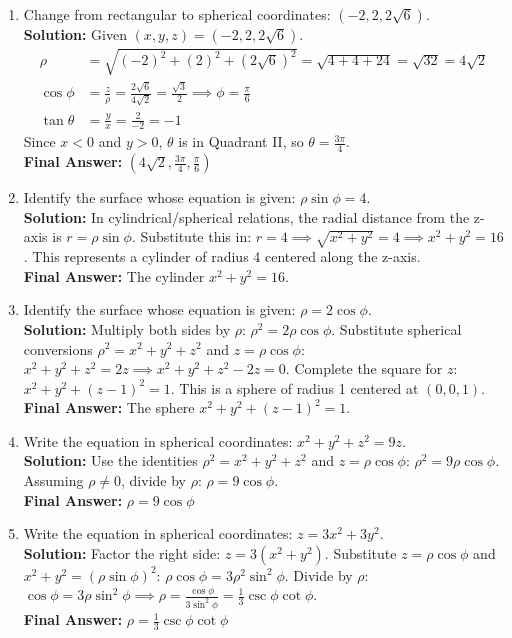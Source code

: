 \documentclass[11pt]{article}
\begin{document}
\begin{enumerate}[label=\textbf{\arabic*.}]
\item Change from rectangular to spherical coordinates: $(-2, 2, 2\sqrt{6})$.\\
\textbf{Solution:} Given $(x, y, z) = (-2, 2, 2\sqrt{6})$.
\begin{align*}
\rho &= \sqrt{(-2)^2 + (2)^2 + (2\sqrt{6})^2} = \sqrt{4 + 4 + 24} = \sqrt{32} = 4\sqrt{2} \\
\cos\phi &= \frac{z}{\rho} = \frac{2\sqrt{6}}{4\sqrt{2}} = \frac{\sqrt{3}}{2} \implies \phi = \frac{\pi}{6} \\
\tan\theta &= \frac{y}{x} = \frac{2}{-2} = -1
\end{align*}
Since $x<0$ and $y>0$, $\theta$ is in Quadrant II, so $\theta = \frac{3\pi}{4}$.\\
\textbf{Final Answer:} $(4\sqrt{2}, \frac{3\pi}{4}, \frac{\pi}{6})$

\item Identify the surface whose equation is given: $\rho \sin\phi = 4$.\\
\textbf{Solution:} In cylindrical/spherical relations, the radial distance from the z-axis is $r = \rho \sin\phi$. Substitute this in:
$r = 4 \implies \sqrt{x^2+y^2} = 4 \implies x^2 + y^2 = 16$.
This represents a cylinder of radius 4 centered along the z-axis.\\
\textbf{Final Answer:} The cylinder $x^2 + y^2 = 16$.

\item Identify the surface whose equation is given: $\rho = 2 \cos\phi$.\\
\textbf{Solution:} Multiply both sides by $\rho$:
$\rho^2 = 2\rho\cos\phi$.
Substitute spherical conversions $\rho^2 = x^2+y^2+z^2$ and $z = \rho\cos\phi$:
$x^2+y^2+z^2 = 2z \implies x^2+y^2+z^2-2z = 0$.
Complete the square for $z$: $x^2+y^2+(z-1)^2 = 1$.
This is a sphere of radius 1 centered at $(0,0,1)$.\\
\textbf{Final Answer:} The sphere $x^2+y^2+(z-1)^2=1$.

\item Write the equation in spherical coordinates: $x^2+y^2+z^2 = 9z$.\\
\textbf{Solution:} Use the identities $\rho^2 = x^2+y^2+z^2$ and $z = \rho\cos\phi$:
$\rho^2 = 9\rho\cos\phi$.
Assuming $\rho \neq 0$, divide by $\rho$:
$\rho = 9\cos\phi$.\\
\textbf{Final Answer:} $\rho = 9\cos\phi$

\item Write the equation in spherical coordinates: $z = 3x^2 + 3y^2$.\\
\textbf{Solution:} Factor the right side: $z = 3(x^2+y^2)$.
Substitute $z = \rho\cos\phi$ and $x^2+y^2 = (\rho\sin\phi)^2$:
$\rho\cos\phi = 3\rho^2\sin^2\phi$.
Divide by $\rho$:
$\cos\phi = 3\rho\sin^2\phi \implies \rho = \frac{\cos\phi}{3\sin^2\phi} = \frac{1}{3}\csc\phi\cot\phi$.\\
\textbf{Final Answer:} $\rho = \frac{1}{3}\csc\phi\cot\phi$


\end{enumerate}
\end{document}
